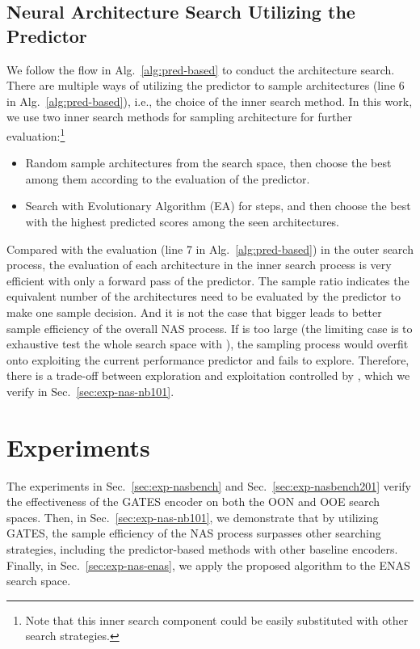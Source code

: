 \documentclass[runningheads]{llncs}
\begin{document}
\subsection{Neural Architecture Search Utilizing the Predictor}
\label{sec:method-nas}


We follow the flow in Alg.~\ref{alg:pred-based} to conduct the architecture search. There are multiple ways of utilizing the predictor  to sample architectures (line 6 in Alg.~\ref{alg:pred-based}), i.e., the choice of the inner search method. In this work, we use two inner search methods for sampling architecture for further evaluation:\footnote{Note that this inner search component could be easily substituted with other search strategies.}
\begin{itemize}
    \item Random sample  architectures from the search space, then choose the best  among them according to the evaluation of the predictor.

    \item Search with Evolutionary Algorithm (EA) for  steps, and then choose the best  with the highest predicted scores among the seen architectures.

\end{itemize}


Compared with the evaluation (line 7 in Alg.~\ref{alg:pred-based}) in the outer search process, the evaluation of each architecture in the inner search process is very efficient with only a forward pass of the predictor.
The sample ratio  indicates the equivalent number of the architectures need to be evaluated by the predictor to make one sample decision. And it is not the case that bigger  leads to better sample efficiency of the overall NAS process. If  is too large (the limiting case is to exhaustive test the whole search space with ), the sampling process would overfit onto exploiting the current performance predictor and fails to explore. Therefore, there is a trade-off between exploration and exploitation controlled by , which we verify in Sec.~\ref{sec:exp-nas-nb101}.




\section{Experiments}
\label{sec:exp}
The experiments in Sec.~\ref{sec:exp-nasbench} and Sec.~\ref{sec:exp-nasbench201} verify the effectiveness of the GATES encoder on both the OON and OOE search spaces. 
Then, in Sec.~\ref{sec:exp-nas-nb101}, we demonstrate that by utilizing GATES, the sample efficiency of the NAS process surpasses other searching strategies, including the predictor-based methods with other baseline encoders.
Finally, in Sec.~\ref{sec:exp-nas-enas}, we apply the proposed algorithm to the ENAS search space. 
\end{document}
